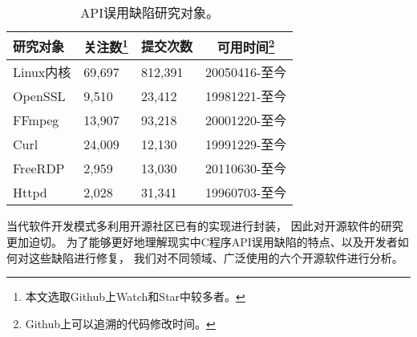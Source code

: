 \begin{table}[b]
	\centering
	\begin{minipage}[t]{0.9\linewidth} %
		\caption{API误用缺陷研究对象。}
		\label{tab:2-3-target}
		\begin{tabular}{lp{3cm}<{\centering}p{3cm}<{\centering}p{4cm}<{\centering}}
			\hline
			{\heiti 研究对象} & 
			\multicolumn{1}{c}{\heiti 关注数\footnote{本文选取Github上Watch和Star中较多者。}} &
			\multicolumn{1}{c}{\heiti 提交次数} & 
			\multicolumn{1}{c}{\heiti 可用时间\footnote{Github上可以追溯的代码修改时间。}} \\
			\hline
			Linux内核   & 69,697 & 812,391 & 20050416-至今\\
			OpenSSL   & 9,510 & 23,412 & 19981221-至今\\
			FFmpeg   & 13,907 & 93,218 & 20001220-至今\\
			Curl   & 24,009 & 12,130 & 19991229-至今\\
			FreeRDP   & 2,959 & 13,030 & 20110630-至今\\
			Httpd   & 2,028 & 31,341 & 19960703-至今\\
			\hline
		\end{tabular}
	\end{minipage}
\end{table}

当代软件开发模式多利用开源社区已有的实现进行封装，
因此对开源软件的研究更加迫切。
为了能够更好地理解现实中C程序API误用缺陷的特点、以及开发者如何对这些缺陷进行修复，
我们对不同领域、广泛使用的六个开源软件进行分析。

